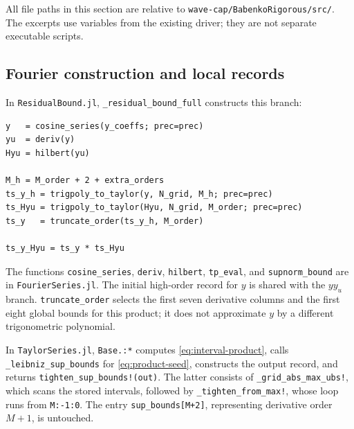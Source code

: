 \documentclass[11pt]{article}
\theoremstyle{definition}
\theoremstyle{remark}
\newcommand{\code}[1]{\nolinkurl{#1}}
\numberwithin{equation}{section}
\begin{document}
All file paths in this section are relative to
\code{wave-cap/BabenkoRigorous/src/}. The excerpts use variables from the
existing driver; they are not separate executable scripts.

\subsection{Fourier construction and local records}
In \code{ResidualBound.jl}, \code{_residual_bound_full} constructs this branch:
\begin{lstlisting}
y   = cosine_series(y_coeffs; prec=prec)
yu  = deriv(y)
Hyu = hilbert(yu)

M_h = M_order + 2 + extra_orders
ts_y_h = trigpoly_to_taylor(y, N_grid, M_h; prec=prec)
ts_Hyu = trigpoly_to_taylor(Hyu, N_grid, M_order; prec=prec)
ts_y   = truncate_order(ts_y_h, M_order)

ts_y_Hyu = ts_y * ts_Hyu
\end{lstlisting}
The functions \code{cosine_series}, \code{deriv}, \code{hilbert},
\code{tp_eval}, and \code{supnorm_bound} are in \code{FourierSeries.jl}.
The initial high-order record for $y$ is shared with the $yy_u$ branch.
\code{truncate_order} selects the first seven derivative columns and the
first eight global bounds for this product; it does not approximate $y$
by a different trigonometric polynomial.

In \code{TaylorSeries.jl}, \code{Base.:*} computes
\eqref{eq:interval-product}, calls \code{_leibniz_sup_bounds} for
\eqref{eq:product-seed}, constructs the output record, and returns
\code{tighten_sup_bounds!(out)}. The latter consists of
\code{_grid_abs_max_ubs!}, which scans the stored intervals, followed by
\code{_tighten_from_max!}, whose loop runs from \code{M:-1:0}.
The entry \code{sup_bounds[M+2]}, representing derivative order $M+1$,
is untouched.
\end{document}

